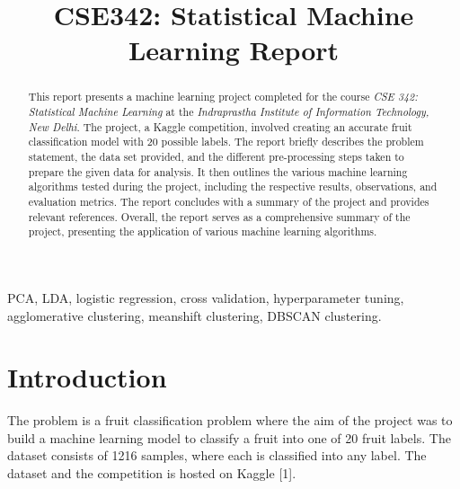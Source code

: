 \documentclass[conference]{IEEEtran}
\begin{document}
\title{CSE342: Statistical Machine Learning Report}
\makeatletter
\newcommand{\linebreakand}{%
  \end{@IEEEauthorhalign}
  \hfill\mbox{}\par
  \mbox{}\hfill\begin{@IEEEauthorhalign}
}
\makeatother

\author{
    \and
}

\maketitle

\begin{abstract}
    This report presents a machine learning project completed for the course \textit{CSE 342: Statistical Machine Learning} at the \textit{Indraprastha Institute of Information Technology, New Delhi}. The project, a Kaggle competition, involved creating an accurate fruit classification model with 20 possible labels. 
    The report briefly describes the problem statement, the data set provided, and the different pre-processing steps taken to prepare the given data for analysis. It then outlines the various machine learning algorithms tested during the project, including the respective results, observations, and evaluation metrics. 
    The report concludes with a summary of the project and provides relevant references. Overall, the report serves as a comprehensive summary of the project, presenting the application of various machine learning algorithms.
\end{abstract}
\begin{IEEEkeywords}
    PCA, LDA, logistic regression, cross validation, hyperparameter tuning, agglomerative clustering, meanshift clustering, DBSCAN clustering.
\end{IEEEkeywords}

\section{Introduction}
    The problem is a fruit classification problem where the aim of the project was to build a machine learning model to classify a fruit into one of 20 fruit labels. The dataset consists of 1216 samples, where each is classified into any label. The dataset and the competition is hosted on Kaggle [1]. 
\end{document}
